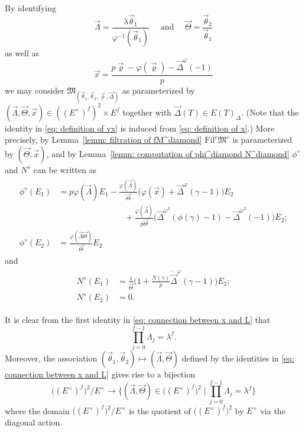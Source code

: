 \documentclass[11pt]{amsart}
\theoremstyle{definition}
\numberwithin{equation}{subsection}
\theoremstyle{plain}
\theoremstyle{plain}
\theoremstyle{plain}
\theoremstyle{plain}
\theoremstyle{plain}
\theoremstyle{plain}
\theoremstyle{plain}
\theoremstyle{plain}
\theoremstyle{plain}
\theoremstyle{plain}
\theoremstyle{plain}
\theoremstyle{plain}
\theoremstyle{definition}
\theoremstyle{definition}
\theoremstyle{definition}
\theoremstyle{remark}
\renewcommand{\(}{\textup{(}}
\renewcommand{\)}{\textup{)}}
\newcommand{\fM}{\mathfrak{M}}
\newcommand{\Fil}{\mathrm{Fil}}
\newcommand{\vx}{\vec{x}}
\newcommand{\vLambda}{\vec{\Lambda}}
\newcommand{\vth}{\vec{\theta}}
\newcommand{\vrho}{\vec{\varrho}}
\newcommand{\vDel}{\vec{\Delta}}
\newcommand{\vLam}{\vec{\Lambda}}
\newcommand{\vTh}{\vec{\Theta}}
\begin{document}
By identifying 
\begin{equation}\label{eq: connection between x and L}
\vLam=\frac{\lambda\vth_1}{\varphi^{-1}(\vth_1)}\quad\mbox{ and }\quad \vTh=\frac{\vth_2}{\vth_1}
\end{equation}
as well as
\begin{equation}\label{eq: definition of vx}
\vx=\frac{p\vrho-\varphi(\vrho)-\vDel^\varphi(-1)}{p}
\end{equation}
we may consider $\fM_{(\vth_1,\vth_2,\vrho,\vDel)}$ as parameterized by $(\vLam,\vTh,\vx)\in ((E^{\times})^f)^2\times E^f$ together with $\vDel(T)\in E(T)_\Delta$. (Note that the identity in \eqref{eq: definition of vx} is induced from \eqref{eq: definition of x}.) More precisely, by Lemma~\ref{lemm: filtration of fM^diamond} $\Fil^r\fM^\diamond$ is parameterized by $(\vTh,\vx)$, and by Lemma~\ref{lemm: computation of phi^diamond N^diamond} $\phi^\diamond$ and $N^\diamond$ can be written as
\begin{align}\label{eq: phi(E1) and phi(E2)}
\begin{split}
\phi^\diamond(E_1)&=p\varphi(\vLambda)E_1
-\frac{\varphi(\vLam)}{\vTh}\big(\varphi(\vx)+\vDel^\varphi(\gamma-1)\big)E_2\\
&\qquad\qquad\qquad\qquad+\frac{\varphi(\vLam)}{p\vTh}\big(\vDel^{\varphi^2}(\phi(\gamma)-1)-\vDel^{\varphi^2}(-1)\big)E_2;\\
\phi^\diamond(E_2)&=\frac{\varphi(\vLam\vTh)}{\vTh}E_2
\end{split}
\end{align}
and
\begin{align}\label{eq: N(E1) and N(E2)}
\begin{split}
N^\diamond(E_1) &=\frac{1}{\vTh}\bigg(1+\frac{N(\gamma)}{p}\dot{\vDel}^\varphi(\gamma-1)\bigg)E_2;\\
N^\diamond(E_2) &=0.
\end{split}
\end{align}


It is clear from the first identity in \eqref{eq: connection between x and L} that
\begin{equation}\label{eq: From the setting 2}
\prod_{j=0}^{f-1}\Lambda_j=\lambda^f.
\end{equation}
Moreover, the association $(\vth_1,\vth_2)\mapsto (\vLam,\vTh)$ defined by the identities in \eqref{eq: connection between x and L} gives rise to a bijection 
\begin{equation}\label{eq: Lam,Ome,The vs the1,the2}
\big((E^\times)^f\big)^{2}/E^{\times}\longrightarrow\bigg\{(\vLam,\vTh)\in \big((E^\times)^f\big)^{2}\mid \prod_{j=0}^{f-1}\Lambda_j=\lambda^f\bigg\}
\end{equation}
where the domain $\big((E^\times)^f\big)^{2}/E^{\times}$ is the quotient of $\big((E^\times)^f\big)^{2}$ by $E^\times$ via the diagonal action.
\end{document}
